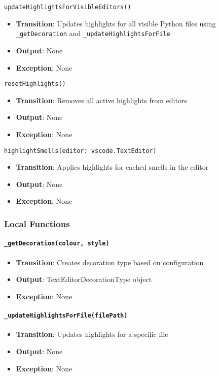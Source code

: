 \documentclass[12pt, titlepage]{article}
\begin{document}
\texttt{updateHighlightsForVisibleEditors()}
\begin{itemize}
\item \textbf{Transition}: Updates highlights for all visible Python files using \texttt{\_getDecoration} and \texttt{\_updateHighlightsForFile}
\item \textbf{Output}: None
\item \textbf{Exception}: None
\end{itemize}

\texttt{resetHighlights()}
\begin{itemize}
\item \textbf{Transition}: Removes all active highlights from editors
\item \textbf{Output}: None
\item \textbf{Exception}: None
\end{itemize}

\texttt{highlightSmells(editor: vscode.TextEditor)}
\begin{itemize}
\item \textbf{Transition}: Applies highlights for cached smells in the editor
\item \textbf{Output}: None
\item \textbf{Exception}: None
\end{itemize}

\subsubsection{Local Functions}

\paragraph{\texttt{\_getDecoration(colour, style)}}
\begin{itemize}
  \item \textbf{Transition}: Creates decoration type based on configuration
  \item \textbf{Output}: TextEditorDecorationType object
  \item \textbf{Exception}: None
\end{itemize}

\paragraph{\texttt{\_updateHighlightsForFile(filePath)}}
\begin{itemize}
  \item \textbf{Transition}: Updates highlights for a specific file
  \item \textbf{Output}: None
  \item \textbf{Exception}: None
\end{itemize}
\end{document}
